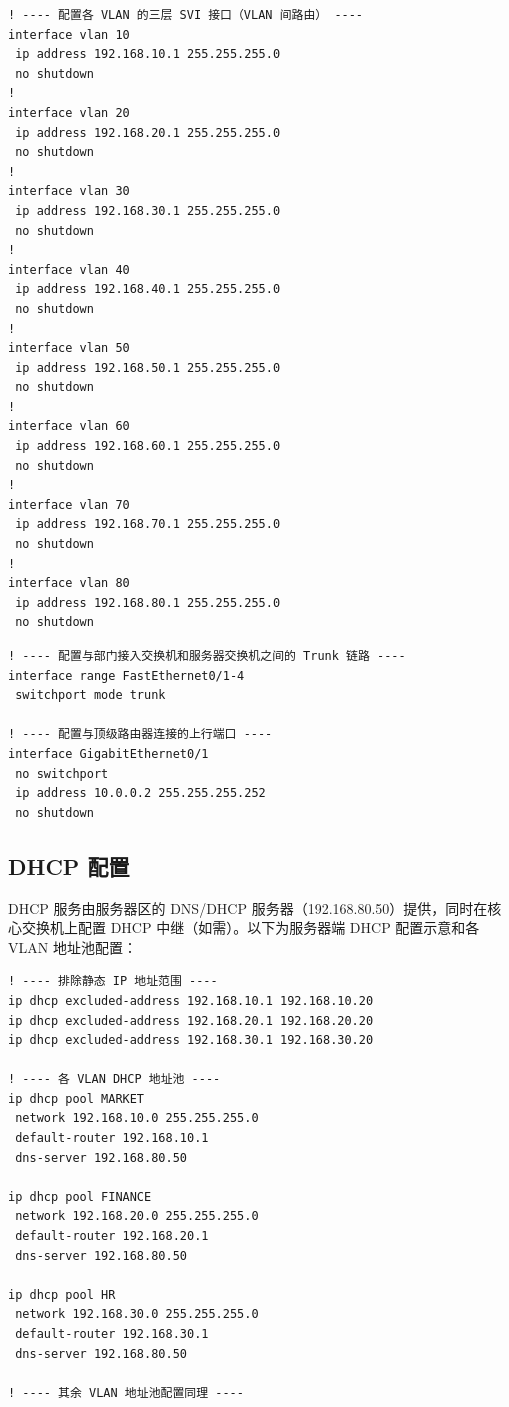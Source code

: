 \documentclass[12pt,a4paper]{ctexart}
\begin{document}
\begin{lstlisting}[caption={总部核心交换机 SVI 接口配置}, label={lst:core-sw-svi}]
! ---- 配置各 VLAN 的三层 SVI 接口（VLAN 间路由） ----
interface vlan 10
 ip address 192.168.10.1 255.255.255.0
 no shutdown
!
interface vlan 20
 ip address 192.168.20.1 255.255.255.0
 no shutdown
!
interface vlan 30
 ip address 192.168.30.1 255.255.255.0
 no shutdown
!
interface vlan 40
 ip address 192.168.40.1 255.255.255.0
 no shutdown
!
interface vlan 50
 ip address 192.168.50.1 255.255.255.0
 no shutdown
!
interface vlan 60
 ip address 192.168.60.1 255.255.255.0
 no shutdown
!
interface vlan 70
 ip address 192.168.70.1 255.255.255.0
 no shutdown
!
interface vlan 80
 ip address 192.168.80.1 255.255.255.0
 no shutdown
\end{lstlisting}

\begin{lstlisting}[caption={Trunk 端口配置}, label={lst:core-sw-trunk}]
! ---- 配置与部门接入交换机和服务器交换机之间的 Trunk 链路 ----
interface range FastEthernet0/1-4
 switchport mode trunk

! ---- 配置与顶级路由器连接的上行端口 ----
interface GigabitEthernet0/1
 no switchport
 ip address 10.0.0.2 255.255.255.252
 no shutdown
\end{lstlisting}

\subsection{DHCP 配置}

DHCP 服务由服务器区的 DNS/DHCP 服务器（192.168.80.50）提供，同时在核心交换机上配置 DHCP 中继（如需）。以下为服务器端 DHCP 配置示意和各 VLAN 地址池配置：

\begin{lstlisting}[caption={核心交换机 DHCP 配置}, label={lst:dhcp}]
! ---- 排除静态 IP 地址范围 ----
ip dhcp excluded-address 192.168.10.1 192.168.10.20
ip dhcp excluded-address 192.168.20.1 192.168.20.20
ip dhcp excluded-address 192.168.30.1 192.168.30.20

! ---- 各 VLAN DHCP 地址池 ----
ip dhcp pool MARKET
 network 192.168.10.0 255.255.255.0
 default-router 192.168.10.1
 dns-server 192.168.80.50

ip dhcp pool FINANCE
 network 192.168.20.0 255.255.255.0
 default-router 192.168.20.1
 dns-server 192.168.80.50

ip dhcp pool HR
 network 192.168.30.0 255.255.255.0
 default-router 192.168.30.1
 dns-server 192.168.80.50

! ---- 其余 VLAN 地址池配置同理 ----
\end{lstlisting}
\end{document}
